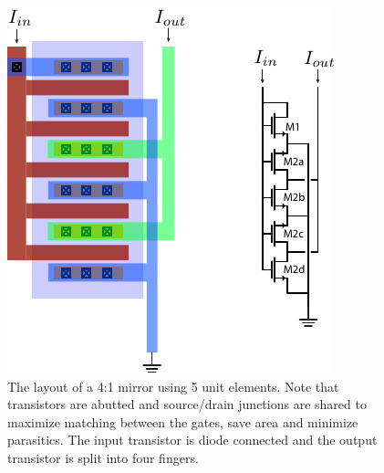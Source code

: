 \begin{figure}[tb]
\centering
\includegraphics[width=.55\columnwidth]{mirror_layout.pdf} 
\caption{The layout of a 4:1 mirror using 5 unit elements. Note that transistors are abutted and source/drain junctions are shared to maximize matching between the gates, save area and minimize parasitics.  The input transistor is diode connected and the output transistor is split into four fingers.}
\label{fig:mirror_layout}
\end{figure}
